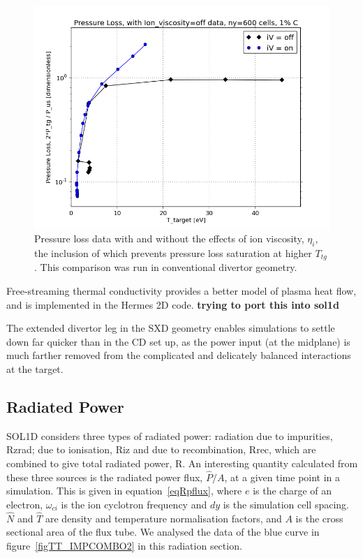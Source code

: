 \documentclass[12pt]{article}  %
\providecommand{\Ttg}{$T_{tg}~$} %
\begin{document}
\begin{figure}
	\includegraphics[scale=0.5]{Figures/sol1d/PL_iVpts.png}
	\centering
	\caption{Pressure loss data with and without the effects of ion viscosity, $\eta_i$, the inclusion of which prevents pressure loss saturation at higher \Ttg. This comparison was run in conventional divertor geometry.}\label{figPL_iVpts}
\end{figure}

Free-streaming thermal conductivity provides a better model of plasma heat flow, and is implemented in the Hermes 2D code. \textbf{trying to port this into sol1d}

The extended divertor leg in the SXD geometry enables simulations to settle down far quicker than in the CD set up, as the power input (at the midplane) is much farther removed from the complicated and delicately balanced interactions at the target. 



\subsection{Radiated Power}\label{ssecRpower}
SOL1D considers three types of radiated power: radiation due to impurities, Rzrad; due to ionisation, Riz and due to recombination, Rrec, which are combined to give total radiated power, R. An interesting quantity calculated from these three sources is the radiated power flux, $ \hat{P}/A $, at a given time point in a simulation. This is given in equation~\ref{eqRpflux}, where $e$ is the charge of an electron, $\omega_{ci}$ is the ion cyclotron frequency and $dy$ is the simulation cell spacing. $\hat{N}$ and $\hat{T}$ are density and temperature normalisation factors, and $ A $ is the cross sectional area of the flux tube. We analysed the data of the blue curve in figure~\ref{figTT_IMPCOMBO2} in this radiation section. 
\end{document}
